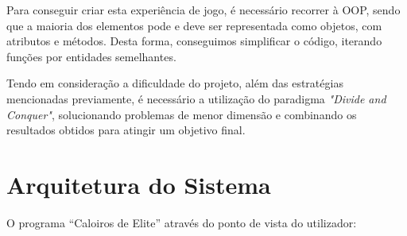 \documentclass[a4paper,11pt]{article}
\begin{document}
\vspace{8pt}

Para conseguir criar esta experiência de jogo, é necessário recorrer à OOP, sendo que a maioria dos elementos pode e deve ser representada como objetos, com atributos e métodos. Desta forma, conseguimos simplificar o código, iterando funções por entidades semelhantes.

\vspace{8pt}

Tendo em consideração a dificuldade do projeto, além das estratégias mencionadas previamente, é necessário a utilização do paradigma \textit{"Divide and Conquer"}, solucionando problemas de menor dimensão e combinando os resultados obtidos para atingir um objetivo final.

\pagebreak

\section{Arquitetura do Sistema}

\vspace{8pt}


O programa “Caloiros de Elite” através do ponto de vista do utilizador:
\end{document}
